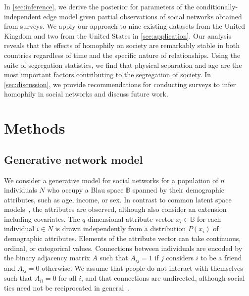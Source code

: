 \documentclass{scrartcl}
\newcommand{\population}{N}
\newcommand{\blauspace}{\mathbb{B}}
\begin{document}
\begin{refsection}
In \cref{sec:inference}, we derive the posterior for parameters of the conditionally-independent edge model given partial observations of social networks obtained from surveys. We apply our approach to nine existing datasets from the United Kingdom and two from the United States in \cref{sec:application}. Our analysis reveals that the effects of homophily on society are remarkably stable in both countries regardless of time and the specific nature of relationships. Using the suite of segregation statistics, we find that physical separation and age are the most important factors contributing to the segregation of society. In \cref{sec:discussion}, we provide recommendations for conducting surveys to infer homophily in social networks and discuss future work.

\section{Methods}

\subsection{Generative network model\label{sec:model}}

We consider a generative model for social networks for a population of $n$ individuals $\population$ who occupy a Blau space $\blauspace$ spanned by their demographic attributes, such as age, income, or sex. In contrast to common latent space models~\cite{Hoff2002, Hoff2008}, the attributes are observed, although \textcite{Hoff2002} also consider an extension including covariates. The $q$-dimensional attribute vector $x_i\in\blauspace$ for each individual $i\in \population$ is drawn independently from a distribution $P(x_i)$ of demographic attributes. Elements of the attribute vector can take continuous, ordinal, or categorical values. Connections between individuals are encoded by the binary adjacency matrix $A$ such that $A_{ij}=1$ if $j$ considers $i$ to be a friend and $A_{ij}=0$ otherwise. We assume that people do not interact with themselves such that $A_{ii}=0$ for all $i$, and that connections are undirected, although social ties need not be reciprocated in general~\cite{Ball2013}.


\end{refsection}
\end{document}
